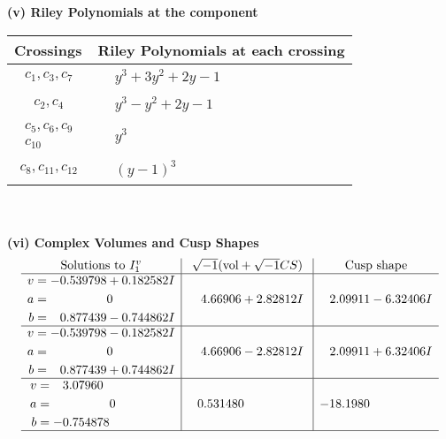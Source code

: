 \documentclass[1p]{elsarticle_modified}
\theoremstyle{definition}
\newcommand{\I}{\sqrt{-1}}
\begin{document}
\newpage\renewcommand{\arraystretch}{1}
\flushleft \textbf{(v) Riley Polynomials at the component}\newline \\
\begin{tabular}{m{50pt}|m{274pt}}
Crossings & \hspace{64pt}Riley Polynomials at each crossing \\
\hline $$\begin{aligned}c_{1},c_{3},c_{7}\end{aligned}$$&$\begin{aligned}
&y^3+3 y^2+2 y-1
\end{aligned}$\\
\hline $$\begin{aligned}c_{2},c_{4}\end{aligned}$$&$\begin{aligned}
&y^3- y^2+2 y-1
\end{aligned}$\\
\hline $$\begin{aligned}c_{5},c_{6},c_{9}\\c_{10}\end{aligned}$$&$\begin{aligned}
&y^3
\end{aligned}$\\
\hline $$\begin{aligned}c_{8},c_{11},c_{12}\end{aligned}$$&$\begin{aligned}
&(y-1)^3
\end{aligned}$\\
\hline
\end{tabular}\\~\\
\newpage\flushleft \textbf{(vi) Complex Volumes and Cusp Shapes}
$$\begin{array}{c|c|c}  
\text{Solutions to }I^v_{1}& \I (\text{vol} + \sqrt{-1}CS) & \text{Cusp shape}\\
 \hline 
\begin{aligned}
v &= -0.539798 + 0.182582 I \\
a &= \phantom{-0.000000 } 0 \\
b &= \phantom{-}0.877439 - 0.744862 I\end{aligned}
 & \phantom{-}4.66906 + 2.82812 I & \phantom{-}2.09911 - 6.32406 I \\ \hline\begin{aligned}
v &= -0.539798 - 0.182582 I \\
a &= \phantom{-0.000000 } 0 \\
b &= \phantom{-}0.877439 + 0.744862 I\end{aligned}
 & \phantom{-}4.66906 - 2.82812 I & \phantom{-}2.09911 + 6.32406 I \\ \hline\begin{aligned}
v &= \phantom{-}3.07960\phantom{ +0.000000I} \\
a &= \phantom{-0.000000 } 0 \\
b &= -0.754878\phantom{ +0.000000I}\end{aligned}
 & \phantom{-}0.531480\phantom{ +0.000000I} & -18.1980\phantom{ +0.000000I}\\
 \hline 
 \end{array}$$\newpage
\end{document}
